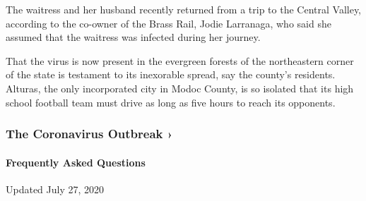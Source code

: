 The waitress and her husband recently returned from a trip to the
Central Valley, according to the co-owner of the Brass Rail, Jodie
Larranaga, who said she assumed that the waitress was infected during
her journey.

That the virus is now present in the evergreen forests of the
northeastern corner of the state is testament to its inexorable spread,
say the county's residents. Alturas, the only incorporated city in Modoc
County, is so isolated that its high school football team must drive as
long as five hours to reach its opponents.

\href{https://www.nytimes.com/news-event/coronavirus?action=click\&pgtype=Article\&state=default\&region=MAIN_CONTENT_3\&context=storylines_faq}{}

\hypertarget{the-coronavirus-outbreak-}{%
\subsubsection{The Coronavirus Outbreak
›}\label{the-coronavirus-outbreak-}}

\hypertarget{frequently-asked-questions}{%
\paragraph{Frequently Asked
Questions}\label{frequently-asked-questions}}

Updated July 27, 2020

